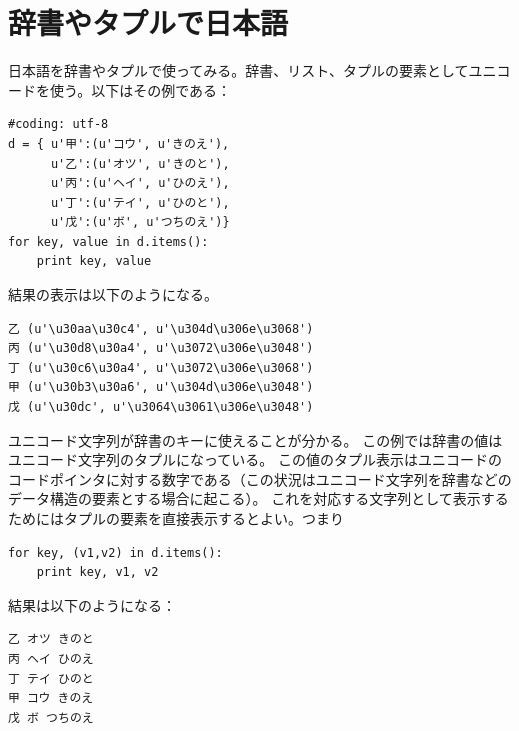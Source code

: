 \documentclass[a4j,12pt,makeidx]{jbook}
\begin{document}
\section{辞書やタプルで日本語}
日本語を辞書やタプルで使ってみる。辞書、リスト、タプルの要素としてユニコードを使う。以下はその例である：
\begin{verbatim}
#coding: utf-8
d = { u'甲':(u'コウ', u'きのえ'),
      u'乙':(u'オツ', u'きのと'),
      u'丙':(u'ヘイ', u'ひのえ'),
      u'丁':(u'テイ', u'ひのと'),
      u'戊':(u'ボ', u'つちのえ')}
for key, value in d.items():
    print key, value
\end{verbatim}
結果の表示は以下のようになる。
\begin{verbatim}
乙 (u'\u30aa\u30c4', u'\u304d\u306e\u3068')
丙 (u'\u30d8\u30a4', u'\u3072\u306e\u3048')
丁 (u'\u30c6\u30a4', u'\u3072\u306e\u3068')
甲 (u'\u30b3\u30a6', u'\u304d\u306e\u3048')
戊 (u'\u30dc', u'\u3064\u3061\u306e\u3048')
\end{verbatim}
ユニコード文字列が辞書のキーに使えることが分かる。
この例では辞書の値はユニコード文字列のタプルになっている。
この値のタプル表示はユニコードのコードポインタに対する数字である（この状況はユニコード文字列を辞書などのデータ構造の要素とする場合に起こる）。
これを対応する文字列として表示するためにはタプルの要素を直接表示するとよい。つまり
\begin{verbatim}
for key, (v1,v2) in d.items():
    print key, v1, v2
\end{verbatim}
結果は以下のようになる：
\begin{verbatim}
乙 オツ きのと
丙 ヘイ ひのえ
丁 テイ ひのと
甲 コウ きのえ
戊 ボ つちのえ
\end{verbatim}
%
\end{document}
